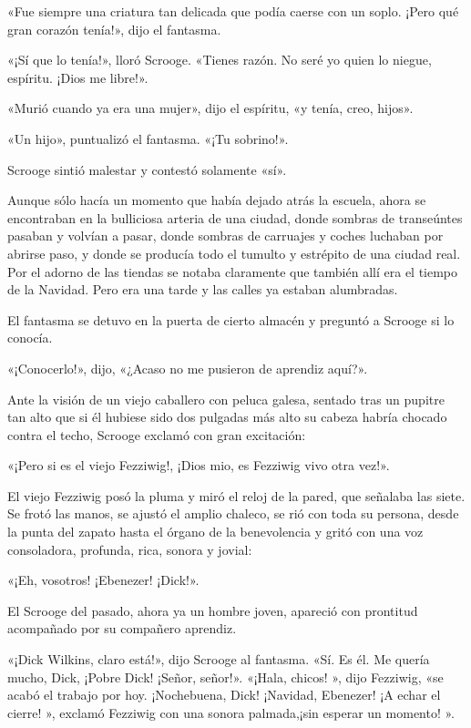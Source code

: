 \documentclass{novela}
\begin{document}
 «Fue siempre una criatura tan delicada que podía caerse con un soplo. ¡Pero qué gran corazón tenía!», dijo el fantasma.

 «¡Sí que lo tenía!», lloró Scrooge. «Tienes razón. No seré yo quien lo niegue, espíritu. ¡Dios me libre!».

 «Murió cuando ya era una mujer», dijo el espíritu, «y tenía, creo, hijos».

 «Un hijo», puntualizó el fantasma. «¡Tu sobrino!».

 Scrooge sintió malestar y contestó solamente «sí».

 Aunque sólo hacía un momento que había dejado atrás la escuela, ahora se encontraban en la bulliciosa arteria de una ciudad, donde sombras de transeúntes pasaban y volvían a pasar, donde sombras de carruajes y coches luchaban por abrirse paso, y donde se producía todo el tumulto y estrépito de una ciudad real. Por el adorno de las tiendas se notaba claramente que también allí era el tiempo de la Navidad. Pero era una tarde y las calles ya estaban alumbradas.

 El fantasma se detuvo en la puerta de cierto almacén y preguntó a Scrooge si lo conocía.

 «¡Conocerlo!», dijo, «¿Acaso no me pusieron de aprendiz aquí?».

 Ante la visión de un viejo caballero con peluca galesa, sentado tras un pupitre tan alto que si él hubiese sido dos pulgadas más alto su cabeza habría chocado contra el techo, Scrooge exclamó con gran excitación:

 «¡Pero si es el viejo Fezziwig!, ¡Dios mio, es Fezziwig vivo otra vez!».

 El viejo Fezziwig posó la pluma y miró el reloj de la pared, que señalaba las siete. Se frotó las manos, se ajustó el amplio chaleco, se rió con toda su persona, desde la punta del zapato hasta el órgano de la benevolencia y gritó con una voz consoladora, profunda, rica, sonora y jovial:

 «¡Eh, vosotros! ¡Ebenezer! ¡Dick!».

 El Scrooge del pasado, ahora ya un hombre joven, apareció con prontitud acompañado por su compañero aprendiz.

 «¡Dick Wilkins, claro está!», dijo Scrooge al fantasma. «Sí. Es él. Me quería mucho, Dick, ¡Pobre Dick! ¡Señor, señor!». «¡Hala, chicos! », dijo Fezziwig, «se acabó el trabajo por hoy. ¡Nochebuena, Dick! ¡Navidad, Ebenezer! ¡A echar el cierre! », exclamó Fezziwig con una sonora palmada,¡sin esperar un momento! ».
\end{document}
